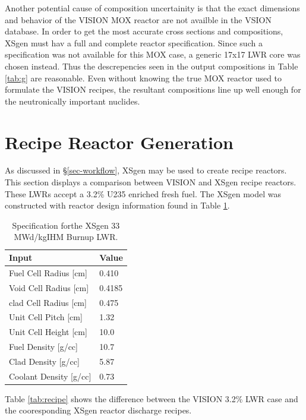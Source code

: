 \documentclass{article}
\begin{document}
Another potential cause of composition uncertainity is that the exact dimensions and behavior
of the VISION MOX reactor are not availble in the VSION database. In order to get the
most accurate cross sections and compositions, XSgen must hav a full and complete reactor
specification. Since such a specification was not available for this MOX case,
a generic 17x17 LWR core was chosen instead. Thus the descrepencies seen in the output
compositions in Table \ref{tab:g} are reasonable. Even without knowing the
true MOX reactor used to formulate the VISION recipes, the resultant compositions line
up well enough for the neutronically important nuclides.

\section{Recipe Reactor Generation}

As discussed in \S\ref{sec-workflow}, XSgen may be used to create recipe reactors.
This section displays a comparison between VISION and XSgen recipe reactors. These LWRs accept
a 3.2\% U235 enriched fresh fuel. The XSgen model was constructed with reactor design
information found in Table \ref{tab:xsgenstats}.

\begin{table}[!htb]
\centering
\caption{Specification forthe XSgen 33 MWd/kgIHM Burnup LWR.}
\label{tab:xsgenstats}
\begin{tabular}{ll}
Input & Value \\
\hline
Fuel Cell Radius [cm] & 0.410 \\
Void Cell Radius [cm] & 0.4185 \\
clad Cell Radius [cm] & 0.475 \\
Unit Cell Pitch  [cm] & 1.32 \\
Unit Cell Height [cm] & 10.0 \\
Fuel Density [g/cc] & 10.7 \\
Clad Density [g/cc] & 5.87 \\
Coolant Density [g/cc] & 0.73 \\
\end{tabular}
\end{table}

Table \ref{tab:recipe} shows the difference between the VISION 3.2\% LWR case and the
cooresponding XSgen reactor discharge recipes.
\end{document}
